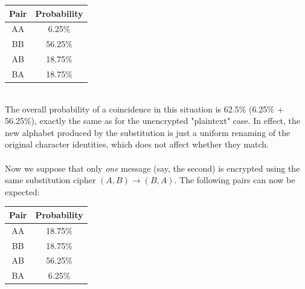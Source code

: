 \documentclass[Lau,binding=0.6cm,oneside]{sapthesis}
\begin{document}
\begin{center}
 \begin{tabular}{||c c||} 
 \hline
 Pair & Probability\\ [0.5ex] 
 \hline\hline
 AA & 6.25\% \\ 
 \hline
 BB & 56.25\% \\
 \hline
 AB & 18.75\% \\
 \hline
 BA & 18.75\% \\
 \hline
\end{tabular}
\end{center}
\ \\

The overall probability of a coincidence in this situation is 62.5\% (6.25\% + 56.25\%), exactly the same as for the unencrypted "plaintext" case. In effect, the new alphabet produced by the substitution is just a uniform renaming of the original character identities, which does not affect whether they match.\\\\
Now we suppose that only \textit{one} message (say, the second) is encrypted using the same substitution cipher $(A, B) \rightarrow (B,A)$. The following pairs can now be expected:\\

\begin{center}
 \begin{tabular}{||c c||} 
 \hline
 Pair & Probability\\ [0.5ex] 
 \hline\hline
 AA & 18.75\% \\ 
 \hline
 BB & 18.75\% \\
 \hline
 AB & 56.25\% \\
 \hline
 BA & 6.25\% \\
 \hline
\end{tabular}
\end{center}
\ \\
\end{document}
